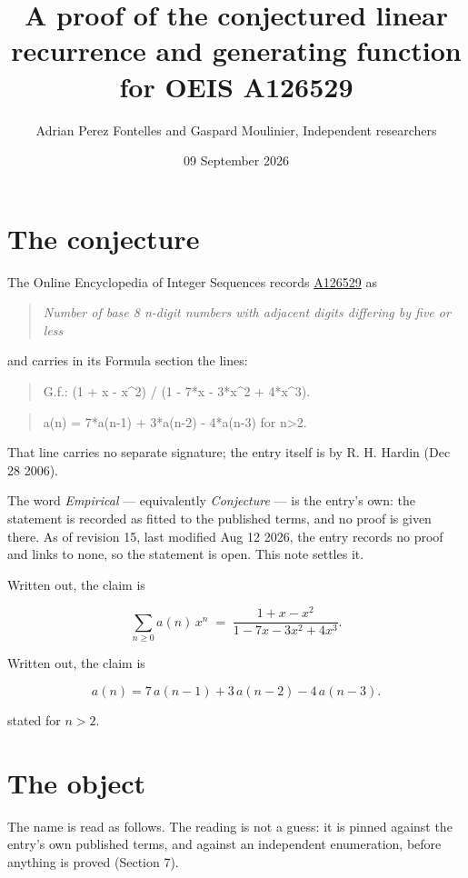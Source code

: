 \documentclass[11pt]{article}
\title{A proof of the conjectured linear recurrence and generating function for OEIS A126529}
\author{Adrian Perez Fontelles and Gaspard Moulinier, Independent researchers}
\date{09 September 2026}
\theoremstyle{definition}
\begin{document}
\maketitle
\section{The conjecture}

The Online Encyclopedia of Integer Sequences records \href{https://oeis.org/A126529}{A126529} as

\begin{quote}\itshape Number of base 8 n-digit numbers with adjacent digits differing by five or less\end{quote}

and carries in its Formula section the lines:

\begin{quote}\ttfamily G.f.: (1 + x - x\textasciicircum{}2) / (1 - 7*x - 3*x\textasciicircum{}2 + 4*x\textasciicircum{}3).\end{quote}

\begin{quote}\ttfamily a(n) = 7*a(n-1) + 3*a(n-2) - 4*a(n-3) for n>2.\end{quote}

That line carries no separate signature; the entry itself is by R. H. Hardin (Dec 28 2006).

The word {\itshape Empirical} --- equivalently {\itshape Conjecture} --- is the entry's own: the statement is recorded as fitted to the published terms, and no proof is given there. As of revision 15, last modified Aug 12 2026, the entry records no proof and links to none, so the statement is open. This note settles it.

Written out, the claim is

\[\sum_{n \ge 0} a(n)\,x^n \;=\; \frac{1 + x - x^{2}}{1 - 7x - 3x^{2} + 4x^{3}}.\]

Written out, the claim is

\[a(n) = 7\,a(n-1) + 3\,a(n-2) - 4\,a(n-3).\]

stated for $n > 2$.

\section{The object}

The name is read as follows. The reading is not a guess: it is pinned against the entry's own published terms, and against an independent enumeration, before anything is proved (Section 7).
\end{document}

